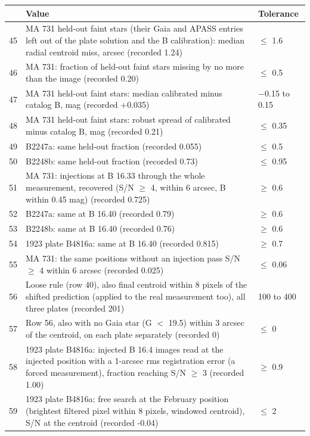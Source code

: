 \documentclass[11pt]{article}
\begin{document}
\begin{appendices}
\begin{table}[ht]
\centering
\scriptsize
\begin{tabular}{@{}rp{}l@{}}
\toprule
 & Value & Tolerance \\
\midrule
45 & MA 731 held-out faint stars (their Gaia and APASS entries left out of the plate solution and the B calibration): median radial centroid miss, arcsec (recorded 1.24) & $\le$ 1.6 \\
46 & MA 731: fraction of held-out faint stars missing by no more than the image (recorded 0.20) & $\le$ 0.5 \\
47 & MA 731 held-out faint stars: median calibrated minus catalog B, mag (recorded +0.035) & $-$0.15 to 0.15 \\
48 & MA 731 held-out faint stars: robust spread of calibrated minus catalog B, mag (recorded 0.21) & $\le$ 0.35 \\
49 & B2247a: same held-out fraction (recorded 0.055) & $\le$ 0.5 \\
50 & B2248b: same held-out fraction (recorded 0.73) & $\le$ 0.95 \\
51 & MA 731: injections at B 16.33 through the whole measurement, recovered (S/N $\ge$ 4, within 6 arcsec, B within 0.45 mag) (recorded 0.725) & $\ge$ 0.6 \\
52 & B2247a: same at B 16.40 (recorded 0.79) & $\ge$ 0.6 \\
53 & B2248b: same at B 16.40 (recorded 0.76) & $\ge$ 0.6 \\
54 & 1923 plate B4816a: same at B 16.40 (recorded 0.815) & $\ge$ 0.7 \\
55 & MA 731: the same positions without an injection pass S/N $\ge$ 4 within 6 arcsec (recorded 0.025) & $\le$ 0.06 \\
56 & Loose rule (row 40), also final centroid within 8 pixels of the shifted prediction (applied to the real measurement too), all three plates (recorded 201) & 100 to 400 \\
57 & Row 56, also with no Gaia star (G $<$ 19.5) within 3 arcsec of the centroid, on each plate separately (recorded 0) & $\le$ 0 \\
58 & 1923 plate B4816a: injected B 16.4 images read at the injected position with a 1-arcsec rms registration error (a forced measurement), fraction reaching S/N $\ge$ 3 (recorded 1.00) & $\ge$ 0.9 \\
59 & 1923 plate B4816a: free search at the February position (brightest filtered pixel within 8 pixels, windowed centroid), S/N at the centroid (recorded -0.04) & $\le$ 2 \\

\end{tabular}
\end{table}
\end{appendices}
\end{document}
